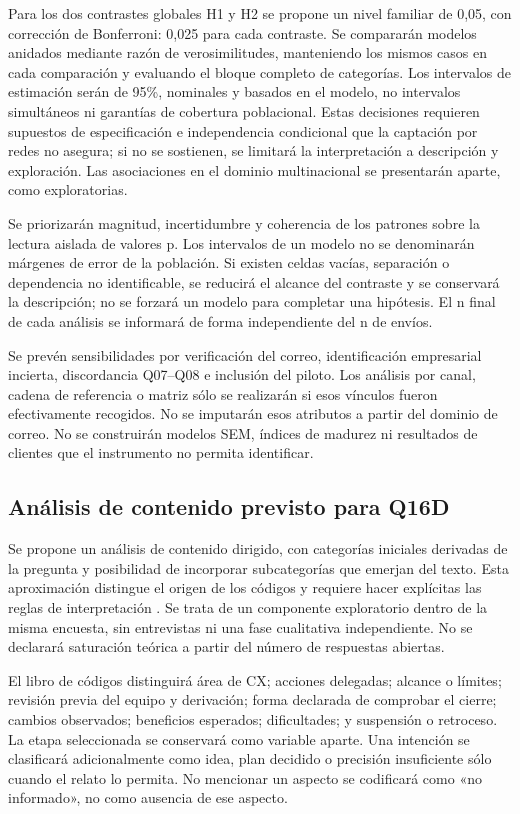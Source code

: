 \documentclass[12pt,letterpaper]{article}
\begin{document}
Para los dos contrastes globales H1 y H2 se propone un nivel familiar de 0,05, con corrección de Bonferroni: 0,025 para cada contraste. Se compararán modelos anidados mediante razón de verosimilitudes, manteniendo los mismos casos en cada comparación y evaluando el bloque completo de categorías. Los intervalos de estimación serán de 95\%, nominales y basados en el modelo, no intervalos simultáneos ni garantías de cobertura poblacional. Estas decisiones requieren supuestos de especificación e independencia condicional que la captación por redes no asegura; si no se sostienen, se limitará la interpretación a descripción y exploración. Las asociaciones en el dominio multinacional se presentarán aparte, como exploratorias.

Se priorizarán magnitud, incertidumbre y coherencia de los patrones sobre la lectura aislada de valores p. Los intervalos de un modelo no se denominarán márgenes de error de la población. Si existen celdas vacías, separación o dependencia no identificable, se reducirá el alcance del contraste y se conservará la descripción; no se forzará un modelo para completar una hipótesis. El n final de cada análisis se informará de forma independiente del n de envíos.

Se prevén sensibilidades por verificación del correo, identificación empresarial incierta, discordancia Q07--Q08 e inclusión del piloto. Los análisis por canal, cadena de referencia o matriz sólo se realizarán si esos vínculos fueron efectivamente recogidos. No se imputarán esos atributos a partir del dominio de correo. No se construirán modelos SEM, índices de madurez ni resultados de clientes que el instrumento no permita identificar.

\subsection*{Análisis de contenido previsto para Q16D}
Se propone un análisis de contenido dirigido, con categorías iniciales derivadas de la pregunta y posibilidad de incorporar subcategorías que emerjan del texto. Esta aproximación distingue el origen de los códigos y requiere hacer explícitas las reglas de interpretación \citep{contentanalysis}. Se trata de un componente exploratorio dentro de la misma encuesta, sin entrevistas ni una fase cualitativa independiente. No se declarará saturación teórica a partir del número de respuestas abiertas.

El libro de códigos distinguirá área de CX; acciones delegadas; alcance o límites; revisión previa del equipo y derivación; forma declarada de comprobar el cierre; cambios observados; beneficios esperados; dificultades; y suspensión o retroceso. La etapa seleccionada se conservará como variable aparte. Una intención se clasificará adicionalmente como idea, plan decidido o precisión insuficiente sólo cuando el relato lo permita. No mencionar un aspecto se codificará como «no informado», no como ausencia de ese aspecto.
\end{document}
